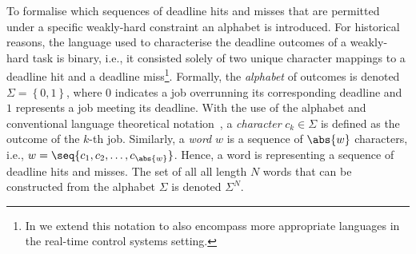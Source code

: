 To formalise which sequences of deadline hits and misses that are permitted under a specific weakly-hard constraint an alphabet is introduced.
For historical reasons, the language used to characterise the deadline outcomes of a weakly-hard task is binary, i.e., it consisted solely of two unique character mappings to a deadline hit and a deadline miss\footnote{In  we extend this notation to also encompass more appropriate languages in the real-time control systems setting.}.
Formally, the \emph{alphabet} of outcomes is denoted $\Sigma = \left\{ 0, 1 \right\}$, where $0$ indicates a job overrunning its corresponding deadline and $1$ represents a job meeting its deadline.
With the use of the alphabet and conventional language theoretical notation~\cite{Hopcroft:2006}, a \emph{character} $c_k \in \Sigma$ is defined as the outcome of the $k$-th job.
Similarly, a \emph{word} $w$ is a sequence of $\abs{w}$ characters, i.e., $w = \seq{c_1, c_2, \ldots, c_{\abs{w}}}$.
Hence, a word is representing a sequence of deadline hits and misses.
The set of all all length $N$ words that can be constructed from the alphabet $\Sigma$ is denoted $\Sigma^N$.

